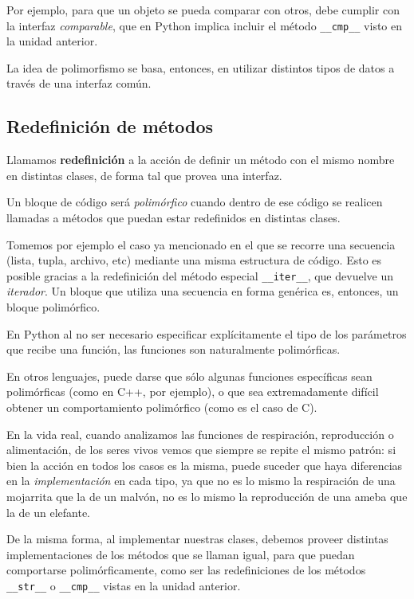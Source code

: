 Por ejemplo, para que un objeto se pueda comparar con otros, debe cumplir
con la interfaz {\it comparable}, que en Python implica incluir el método
\lstinline!__cmp__! visto en la unidad anterior.

La idea de polimorfismo se basa, entonces, en utilizar distintos tipos de
datos a través de una interfaz común.

\subsection{Redefinición de métodos}

Llamamos {\bf redefinición} a la acción de definir un método con el mismo
nombre en distintas clases, de forma tal que provea una interfaz.

Un bloque de código será {\it polimórfico} cuando dentro de ese código se
realicen llamadas a métodos que puedan estar redefinidos en distintas
clases.

Tomemos por ejemplo el caso ya mencionado en el que se recorre una
secuencia (lista, tupla, archivo, etc) mediante una misma estructura de
código.  Esto es posible gracias a la redefinición del método especial
\lstinline!__iter__!, que devuelve un {\it iterador}.  Un bloque que
utiliza una secuencia en forma genérica es, entonces, un bloque
polimórfico.

\begin{sabias_que}
En Python al no ser necesario especificar explícitamente el tipo de los
parámetros que recibe una función, las funciones son naturalmente
polimórficas.

En otros lenguajes, puede darse que sólo algunas funciones específicas sean
polimórficas (como en C++, por ejemplo), o que sea extremadamente difícil
obtener un comportamiento polimórfico (como es el caso de C).
\end{sabias_que}

En la vida real, cuando analizamos las funciones de respiración,
reproducción o alimentación, de los seres vivos vemos que siempre se repite
el mismo patrón: si bien la acción en todos los casos es la misma, puede
suceder que haya diferencias en la {\it implementación} en cada tipo, ya
que no es lo mismo la respiración de una mojarrita que la de un malvón, no
es lo mismo la reproducción de una ameba que la de un elefante.

De la misma forma, al implementar nuestras clases, debemos proveer
distintas implementaciones de los métodos que se llaman igual, para que
puedan comportarse polimórficamente, como ser las redefiniciones de los
métodos \lstinline!__str__! o \lstinline!__cmp__! vistas en la unidad
anterior.

